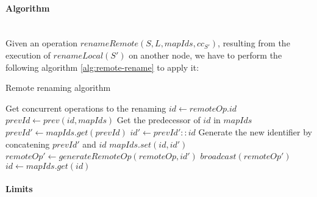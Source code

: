 \documentclass[a4paper]{article}
\begin{document}
\paragraph{Algorithm}~\\

Given an operation $renameRemote(S, L, mapIds, cc_{S'})$,
resulting from the execution of $renameLocal(S')$ on another node,
we have to perform the following algorithm \ref{alg:remote-rename} to apply it:

\begin{algorithm}
  \caption{Remote renaming algorithm}
  \label{alg:remote-rename}
  \begin{algorithmic}
      \Comment Get concurrent operations to the renaming
        \State $id \gets remoteOp.id$
          \State $prevId \gets prev(id, mapIds)$
          \Comment Get the predecessor of $id$ in $mapIds$
          \State $prevId' \gets mapIds.get(prevId)$
          \State $id' \gets prevId' :: id$
          \Comment Generate the new identifier by concatening $prevId'$ and $id$
          \State $mapIds.set(id, id')$
          \State $remoteOp' \gets generateRemoteOp(remoteOp, id')$
          \State $broadcast(remoteOp')$
        \EndIf
      \EndFor
        \State $id \gets mapIds.get(id)$
      \EndFor
    \EndProcedure
  \end{algorithmic}
\end{algorithm}

\paragraph{Limits}~\\
\end{document}

